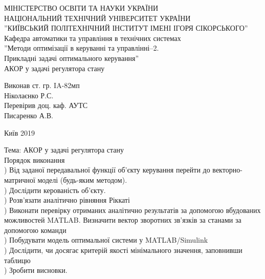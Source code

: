 \documentclass[a4paper]{article}
\begin{document}
 
\begin{center}
\hfill \break
\large{МІНІСТЕРСТВО ОСВІТИ ТА НАУКИ УКРАЇНИ}\\
\large{НАЦІОНАЛЬНИЙ ТЕХНІЧНИЙ УНІВЕРСИТЕТ УКРАЇНИ}\\
\large{''КИЇВСЬКИЙ ПОЛІТЕХНІЧНИЙ ІНСТИТУТ ІМЕНІ ІГОРЯ СІКОРСЬКОГО''}\\

\hfill \break
\normalsize{Кафедра автоматики та управління в технічних системах}\\
\hfill\break
\hfill \break
\hfill \break
\hfill \break
\large{''Методи оптимізації в керуванні та управлінні–2.}\\
\large{Прикладні задачі оптимального керування''}\\
\hfill \break
\hfill \break
\hfill \break
\normalsize{АКОР у задачі регулятора стану}\\
\hfill \break
\hfill \break
\hfill \break
\hfill \break
\end{center}
\hfill \break
\hfill \break
\begin{flushright} 
Виконав ст. гр. IA-82мп\\
Ніколаєнко Р.С.\\
\hfill \break
\hfill \break
Перевірив доц. каф. АУТС\\
Писаренко А.В.\\
\end{flushright}
\hfill \break
\hfill \break
\hfill \break
\hfill \break
\hfill \break
\hfill \break
\begin{center} Київ 2019 \end{center}
 
 
\newpage
Тема: АКОР у задачі регулятора стану\\
\hfill \break
Порядок виконання\\
\hfill \break
{}) Від заданої передавальної функції об’єкту керування перейти до
векторно-матричної моделі (будь-яким методом).\\

\hfill \break
{}) Дослідити керованість об’єкту.\\
\hfill \break
{}) Розв’язати аналітично рівняння Ріккаті \\
\hfill \break
{}) Виконати перевірку отриманих аналітично результатів за допомогою
вбудованих можливостей MATLAB. Визначити вектор зворотних зв’язків за
станами за допомогою команди \\
\hfill \break
{}) Побудувати модель оптимальної системи у MATLAB/Simulink\\
\hfill \break
{}) Дослідити, чи досягає критерій якості мінімального значення,
заповнивши таблицю\\
\hfill \break
{}) Зробити висновки.\\
\end{document}

